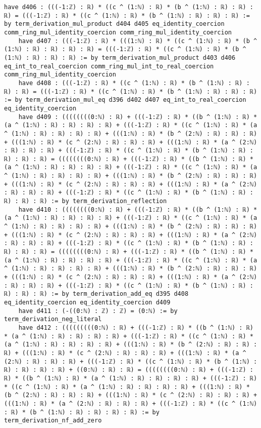 \documentclass{article}
\begin{document}
\begin{tcolorbox}[colback=white!10, width=\linewidth]
\begin{lstlisting}[language=Lean4]
    have d406 : (((-1:ℤ) : ℝ) * ((c ^ (1:ℕ) : ℝ) * (b ^ (1:ℕ) : ℝ) : ℝ) : ℝ) = (((-1:ℤ) : ℝ) * ((c ^ (1:ℕ) : ℝ) * (b ^ (1:ℕ) : ℝ) : ℝ) : ℝ) := by term_derivation_mul_product d404 d405 eq_identity_coercion comm_ring_mul_identity_coercion comm_ring_mul_identity_coercion
    have d407 : (((-1:ℤ) : ℝ) * (((1:ℕ) : ℝ) * ((c ^ (1:ℕ) : ℝ) * (b ^ (1:ℕ) : ℝ) : ℝ) : ℝ) : ℝ) = (((-1:ℤ) : ℝ) * ((c ^ (1:ℕ) : ℝ) * (b ^ (1:ℕ) : ℝ) : ℝ) : ℝ) := by term_derivation_mul_product d403 d406 eq_int_to_real_coercion comm_ring_mul_int_to_real_coercion comm_ring_mul_identity_coercion
    have d408 : (((-1:ℤ) : ℝ) * ((c ^ (1:ℕ) : ℝ) * (b ^ (1:ℕ) : ℝ) : ℝ) : ℝ) = (((-1:ℤ) : ℝ) * ((c ^ (1:ℕ) : ℝ) * (b ^ (1:ℕ) : ℝ) : ℝ) : ℝ) := by term_derivation_mul_eq d396 d402 d407 eq_int_to_real_coercion eq_identity_coercion
    have d409 : ((((((((0:ℕ) : ℝ) + (((-1:ℤ) : ℝ) * ((b ^ (1:ℕ) : ℝ) * (a ^ (1:ℕ) : ℝ) : ℝ) : ℝ) : ℝ) + (((-1:ℤ) : ℝ) * ((c ^ (1:ℕ) : ℝ) * (a ^ (1:ℕ) : ℝ) : ℝ) : ℝ) : ℝ) + (((1:ℕ) : ℝ) * (b ^ (2:ℕ) : ℝ) : ℝ) : ℝ) + (((1:ℕ) : ℝ) * (c ^ (2:ℕ) : ℝ) : ℝ) : ℝ) + (((1:ℕ) : ℝ) * (a ^ (2:ℕ) : ℝ) : ℝ) : ℝ) + (((-1:ℤ) : ℝ) * ((c ^ (1:ℕ) : ℝ) * (b ^ (1:ℕ) : ℝ) : ℝ) : ℝ) : ℝ) = ((((((((0:ℕ) : ℝ) + (((-1:ℤ) : ℝ) * ((b ^ (1:ℕ) : ℝ) * (a ^ (1:ℕ) : ℝ) : ℝ) : ℝ) : ℝ) + (((-1:ℤ) : ℝ) * ((c ^ (1:ℕ) : ℝ) * (a ^ (1:ℕ) : ℝ) : ℝ) : ℝ) : ℝ) + (((1:ℕ) : ℝ) * (b ^ (2:ℕ) : ℝ) : ℝ) : ℝ) + (((1:ℕ) : ℝ) * (c ^ (2:ℕ) : ℝ) : ℝ) : ℝ) + (((1:ℕ) : ℝ) * (a ^ (2:ℕ) : ℝ) : ℝ) : ℝ) + (((-1:ℤ) : ℝ) * ((c ^ (1:ℕ) : ℝ) * (b ^ (1:ℕ) : ℝ) : ℝ) : ℝ) : ℝ) := by term_derivation_reflection
    have d410 : ((((((((0:ℕ) : ℝ) + (((-1:ℤ) : ℝ) * ((b ^ (1:ℕ) : ℝ) * (a ^ (1:ℕ) : ℝ) : ℝ) : ℝ) : ℝ) + (((-1:ℤ) : ℝ) * ((c ^ (1:ℕ) : ℝ) * (a ^ (1:ℕ) : ℝ) : ℝ) : ℝ) : ℝ) + (((1:ℕ) : ℝ) * (b ^ (2:ℕ) : ℝ) : ℝ) : ℝ) + (((1:ℕ) : ℝ) * (c ^ (2:ℕ) : ℝ) : ℝ) : ℝ) + (((1:ℕ) : ℝ) * (a ^ (2:ℕ) : ℝ) : ℝ) : ℝ) + (((-1:ℤ) : ℝ) * ((c ^ (1:ℕ) : ℝ) * (b ^ (1:ℕ) : ℝ) : ℝ) : ℝ) : ℝ) = ((((((((0:ℕ) : ℝ) + (((-1:ℤ) : ℝ) * ((b ^ (1:ℕ) : ℝ) * (a ^ (1:ℕ) : ℝ) : ℝ) : ℝ) : ℝ) + (((-1:ℤ) : ℝ) * ((c ^ (1:ℕ) : ℝ) * (a ^ (1:ℕ) : ℝ) : ℝ) : ℝ) : ℝ) + (((1:ℕ) : ℝ) * (b ^ (2:ℕ) : ℝ) : ℝ) : ℝ) + (((1:ℕ) : ℝ) * (c ^ (2:ℕ) : ℝ) : ℝ) : ℝ) + (((1:ℕ) : ℝ) * (a ^ (2:ℕ) : ℝ) : ℝ) : ℝ) + (((-1:ℤ) : ℝ) * ((c ^ (1:ℕ) : ℝ) * (b ^ (1:ℕ) : ℝ) : ℝ) : ℝ) : ℝ) := by term_derivation_add_eq d395 d408 eq_identity_coercion eq_identity_coercion d409
    have d411 : (-((0:ℕ) : ℤ) : ℤ) = (0:ℕ) := by term_derivation_neg_literal
    have d412 : (((((((((0:ℕ) : ℝ) + (((-1:ℤ) : ℝ) * ((b ^ (1:ℕ) : ℝ) * (a ^ (1:ℕ) : ℝ) : ℝ) : ℝ) : ℝ) + (((-1:ℤ) : ℝ) * ((c ^ (1:ℕ) : ℝ) * (a ^ (1:ℕ) : ℝ) : ℝ) : ℝ) : ℝ) + (((1:ℕ) : ℝ) * (b ^ (2:ℕ) : ℝ) : ℝ) : ℝ) + (((1:ℕ) : ℝ) * (c ^ (2:ℕ) : ℝ) : ℝ) : ℝ) + (((1:ℕ) : ℝ) * (a ^ (2:ℕ) : ℝ) : ℝ) : ℝ) + (((-1:ℤ) : ℝ) * ((c ^ (1:ℕ) : ℝ) * (b ^ (1:ℕ) : ℝ) : ℝ) : ℝ) : ℝ) + ((0:ℕ) : ℝ) : ℝ) = ((((((((0:ℕ) : ℝ) + (((-1:ℤ) : ℝ) * ((b ^ (1:ℕ) : ℝ) * (a ^ (1:ℕ) : ℝ) : ℝ) : ℝ) : ℝ) + (((-1:ℤ) : ℝ) * ((c ^ (1:ℕ) : ℝ) * (a ^ (1:ℕ) : ℝ) : ℝ) : ℝ) : ℝ) + (((1:ℕ) : ℝ) * (b ^ (2:ℕ) : ℝ) : ℝ) : ℝ) + (((1:ℕ) : ℝ) * (c ^ (2:ℕ) : ℝ) : ℝ) : ℝ) + (((1:ℕ) : ℝ) * (a ^ (2:ℕ) : ℝ) : ℝ) : ℝ) + (((-1:ℤ) : ℝ) * ((c ^ (1:ℕ) : ℝ) * (b ^ (1:ℕ) : ℝ) : ℝ) : ℝ) : ℝ) := by term_derivation_nf_add_zero

\end{lstlisting}
\end{tcolorbox}
\end{document}
